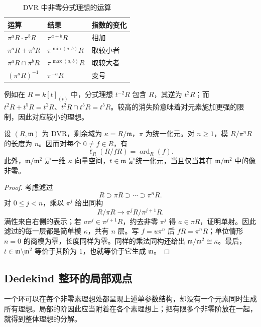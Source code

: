 \begin{table}[htbp]
	\centering
	\caption{DVR 中非零分式理想的运算}
	\label{g5:tab:dvr-ideal-arithmetic}
	\begin{tabular}{lll}
		\toprule
		运算 & 结果 & 指数的变化 \\
		\midrule
		\(\pi^aR\cdot\pi^bR\) & \(\pi^{a+b}R\) & 相加 \\
		\(\pi^aR+\pi^bR\) & \(\pi^{\min(a,b)}R\) & 取较小者 \\
		\(\pi^aR\cap\pi^bR\) & \(\pi^{\max(a,b)}R\) & 取较大者 \\
		\((\pi^aR)^{-1}\) & \(\pi^{-a}R\) & 变号 \\
		\bottomrule
	\end{tabular}
\end{table}

例如在 \(R=k[t]_{(t)}\) 中，分式理想 \(t^{-2}R\) 包含 \(R\)，其逆为 \(t^2R\)；而 \(t^2R+t^5R=t^2R\)、\(t^2R\cap t^5R=t^5R\)。较高的消失阶意味着对元素施加更强的限制，因此对应较小的理想。

\begin{proposition}
\label{g5:prop:dvr-length}
	设 \((R,\mathfrak m)\) 为 DVR，剩余域为 \(\kappa=R/\mathfrak m\)，\(\pi\) 为统一化元。对 \(n\geq1\)，模 \(R/\pi^nR\) 的长度为 \(n\)。因而对每个 \(0\ne f\in R\)，有
	\[
		\ell_R(R/fR)=\operatorname{ord}_R(f).
	\]
	此外，\(\mathfrak m/\mathfrak m^2\) 是一维 \(\kappa\) 向量空间，\(t\in\mathfrak m\) 是统一化元，当且仅当其在 \(\mathfrak m/\mathfrak m^2\) 中的像非零。
\end{proposition}
\begin{proof}
	考虑滤过
	\[
		R\supset\pi R\supset\cdots\supset\pi^nR.
	\]
	对 \(0\leq j<n\)，乘以 \(\pi^j\) 给出同构
	\[
		R/\pi R\longrightarrow\pi^jR/\pi^{j+1}R.
	\]
	满性来自右侧的表示；若 \(a\pi^j\in\pi^{j+1}R\)，约去非零 \(\pi^j\) 得 \(a\in\pi R\)，证明单射。因此滤过的每一层都是简单模 \(\kappa\)，共有 \(n\) 层。写 \(f=u\pi^n\) 后 \(fR=\pi^nR\)；单位情形 \(n=0\) 的商模为零，长度同样为零。同样的乘法同构还给出 \(\mathfrak m/\mathfrak m^2\cong\kappa\)。最后，\(t\in\mathfrak m\setminus\mathfrak m^2\) 等价于其阶为 \(1\)，也就等价于它生成 \(\mathfrak m\)。
\end{proof}

\subsection{Dedekind 整环的局部观点}
\label{g5:subsec:0401:03}

一个环可以在每个非零素理想处都呈现上述单参数结构，却没有一个元素同时生成所有理想。局部的阶因此应当附着在各个素理想上；把有限多个非零阶放在一起，就得到整体理想的分解。

